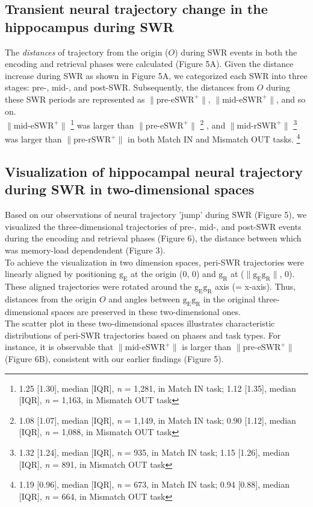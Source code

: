 \subsection{Transient neural trajectory change in the hippocampus during SWR}
The \textit{distances} of trajectory from the origin ($O$) during SWR events in both the encoding and retrieval phases were calculated (Figure 5A). Given the distance increase during SWR as shown in Figure 5A, we categorized each SWR into three stages: pre-, mid-, and post-SWR. Subsequently, the distances from $O$ during these SWR periods are represented as $\mathrm{\lVert \text{pre-eSWR}^+ \rVert}$, $\mathrm{\lVert \text{mid-eSWR}^+ \rVert}$, and so on.
\\
\indent
$\mathrm{\lVert \text{mid-eSWR}^+ \rVert}$
\footnote{1.25 [1.30], median [IQR], \textit{n} = 1,281, in Match IN task; 1.12 [1.35], median [IQR], \textit{n} = 1,163, in Mismatch OUT task}
was larger than $\mathrm{\lVert \text{pre-eSWR}^+ \rVert}$
\footnote{1.08 [1.07], median [IQR], \textit{n} = 1,149, in Match IN task; 0.90 [1.12], median [IQR], \textit{n} = 1,088, in Mismatch OUT task}
, and $\mathrm{\lVert \text{mid-rSWR}^+ \rVert}$
\footnote{1.32 [1.24], median [IQR], \textit{n} = 935, in Match IN task; 1.15 [1.26], median [IQR], \textit{n} = 891, in Mismatch OUT task}
was larger than $\mathrm{\lVert \text{pre-rSWR}^+ \rVert}$ in both Match IN and Mismatch OUT tasks.
\footnote{1.19 [0.96], median [IQR], \textit{n} = 673, in Match IN task; 0.94 [0.88], median [IQR], \textit{n} = 664, in Mismatch OUT task}

\subsection{Visualization of hippocampal neural trajectory during SWR in two-dimensional spaces}
Based on our observations of neural trajectory 'jump' during SWR (Figure 5), we visualized the three-dimensional trajectories of pre-, mid-, and post-SWR events during the encoding and retrieval phases (Figure 6), the distance between which was memory-load dependendent (Figure 3).
\\
\indent
To achieve the visualization in two dimension spaces, peri-SWR trajectories were linearly aligned by positioning $\mathrm{g_{E}}$ at the origin (0, 0) and $\mathrm{g_{R}}$ at ($\mathrm{\lVert g_{E}g_{R} \rVert}$, 0). These aligned trajectories were rotated around the $\mathrm{g_{E}g_{R}}$ axis (= x-axis). Thus, distances from the origin $O$ and angles between $\mathrm{g_{E}g_{R}}$ in the original three-dimensional spaces are preserved in these two-dimensional ones.
\\
\indent
The scatter plot in these two-dimensional spaces illustrates characteristic distributions of peri-SWR trajectories based on phases and task types. For instance, it is observable that $\mathrm{\lVert \text{mid-eSWR}^+ \rVert}$ is larger than $\mathrm{\lVert \text{pre-eSWR}^+ \rVert}$ (Figure 6B), consistent with our earlier findings (Figure 5).

